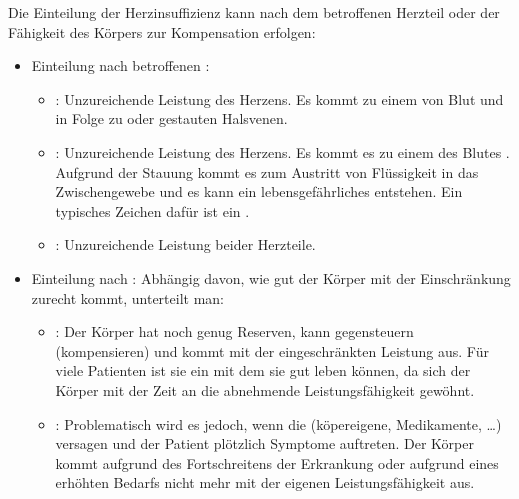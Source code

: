 {Die Einteilung der Herzinsuffizienz kann nach
dem betroffenen Herzteil oder der Fähigkeit des Körpers zur
Kompensation erfolgen:
\begin{itemize}
  \item Einteilung nach betroffenen :
  \begin{itemize}
    \item {}: Unzureichende Leistung des 
    Herzens. Es kommt zu einem  von Blut  und in Folge zu
     oder
    gestauten Halsvenen.
    \item {}:
    Unzureichende Leistung des  Herzens. Es kommt
    es zu einem  des Blutes . Aufgrund der Stauung kommt es zum
    Austritt von Flüssigkeit in das Zwischengewebe und es
    kann ein lebensgefährliches 
    entstehen.
    Ein typisches Zeichen dafür ist ein
    .
    \item {}: Unzureichende Leistung beider Herzteile.
  \end{itemize}
  \item Einteilung nach : Abhängig davon, wie
  gut der Körper mit der
  Einschränkung zurecht kommt, unterteilt man:
  \begin{itemize}
    \item {}: Der Körper hat noch
    genug Reserven, kann gegensteuern (kompensieren) und
    kommt mit der eingeschränkten Leistung aus. Für viele
    Patienten ist sie ein  mit dem sie
    gut leben können, da sich der Körper mit der Zeit an die
    abnehmende Leistungsfähigkeit gewöhnt.
    \item {}:
    Problematisch wird es jedoch, wenn die
     (köpereigene, Medikamente,
    {\dots}) versagen und der Patient plötzlich Symptome
    auftreten.
    Der Körper kommt aufgrund des Fortschreitens der Erkrankung oder aufgrund eines erhöhten Bedarfs nicht mehr
    mit der eigenen Leistungsfähigkeit aus.
  \end{itemize}
\end{itemize}


}
